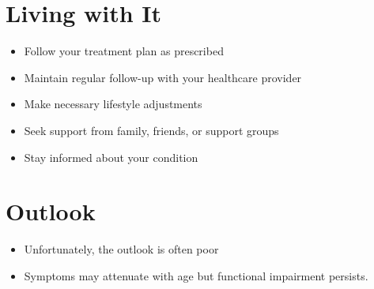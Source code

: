 \section{Living with It}
\begin{itemize}[noitemsep]
  \item Follow your treatment plan as prescribed
  \item Maintain regular follow-up with your healthcare provider
  \item Make necessary lifestyle adjustments
  \item Seek support from family, friends, or support groups
  \item Stay informed about your condition
\end{itemize}
\section{Outlook}
\begin{itemize}[noitemsep]
  \item Unfortunately, the outlook is often poor
  \item Symptoms may attenuate with age but functional impairment persists.
\end{itemize}
